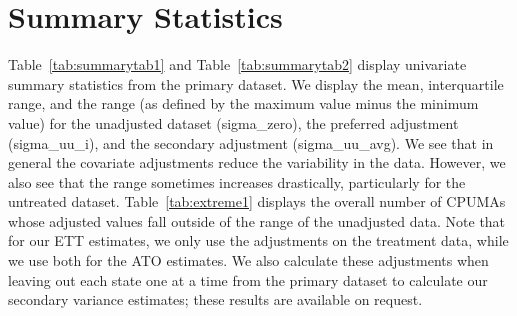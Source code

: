 \section{Summary Statistics}
\label{sec:appendixsumstat}

Table~\ref{tab:summarytab1} and Table~\ref{tab:summarytab2} display univariate summary statistics from the primary dataset. We display the mean, interquartile range, and the range (as defined by the maximum value minus the minimum value) for the unadjusted dataset (sigma\_zero), the preferred adjustment (sigma\_uu\_i), and the secondary adjustment (sigma\_uu\_avg). We see that in general the covariate adjustments reduce the variability in the data. However, we also see that the range sometimes increases drastically, particularly for the untreated dataset. Table~\ref{tab:extreme1} displays the overall number of CPUMAs whose adjusted values fall outside of the range of the unadjusted data. Note that for our ETT estimates, we only use the adjustments on the treatment data, while we use both for the ATO estimates. We also calculate these adjustments when leaving out each state one at a time from the primary dataset to calculate our secondary variance estimates; these results are available on request. 

